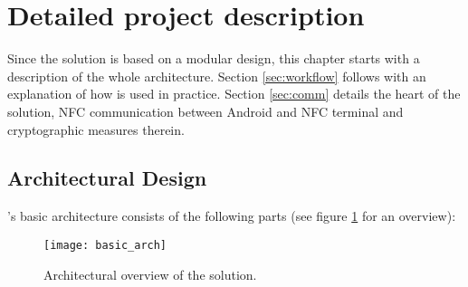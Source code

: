 \section{Detailed project description}\label{sec:description}

Since the \app solution is based on a modular design, this chapter starts with a description of the whole architecture.
Section \ref{sec:workflow} follows with an explanation of how \app is used in practice.
Section \ref{sec:comm} details the heart of the solution, NFC communication between Android and NFC terminal and cryptographic measures therein.

\subsection{Architectural Design}\label{sec:arch}


\app's basic architecture consists of the following parts (see figure \ref{fig:arch_ov} for an overview):

\begin{figure}
\centering
\texttt{[image: basic\_arch]}
\caption{Architectural overview of the \app solution.}
\label{fig:arch_ov}
\end{figure}


